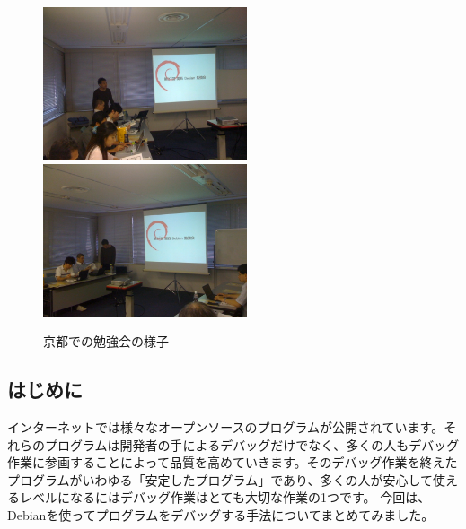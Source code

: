 \documentclass[mingoth,a4paper]{jsarticle}
\begin{document}
\begin{figure}[h]
 \begin{center}
 \includegraphics[width=6cm]{image200910/kyoto01.jpg}
 \includegraphics[width=6cm]{image200910/kyoto02.jpg}
 \caption{京都での勉強会の様子}
 \end{center}
\end{figure}



\makeatletter
   \renewcommand{\thetable}{%
   \thesection.\arabic{table}}
\makeatother

\makeatletter
    \renewcommand{\thefigure}{%
    \thesection.\arabic{figure}}
\makeatother


\subsection{はじめに}
インターネットでは様々なオープンソースのプログラムが公開されています。それらのプログラムは開発者の手によるデバッグだけでなく、多くの人もデバッグ作業に参画することによって品質を高めていきます。そのデバッグ作業を終えたプログラムがいわゆる「安定したプログラム」であり、多くの人が安心して使えるレベルになるにはデバッグ作業はとても大切な作業の1つです。
今回は、Debianを使ってプログラムをデバッグする手法についてまとめてみました。
\end{document}
